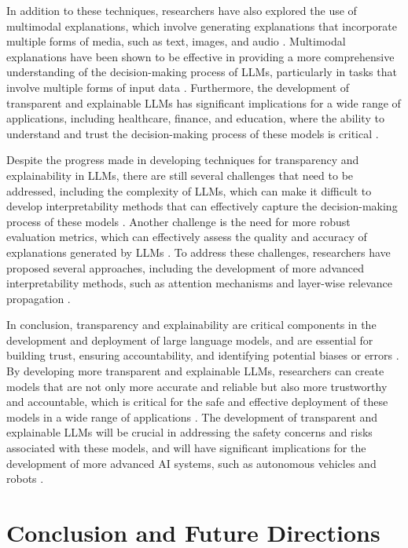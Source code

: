 \documentclass[11pt]{article}
\begin{document}
In addition to these techniques, researchers have also explored the use of multimodal explanations, which involve generating explanations that incorporate multiple forms of media, such as text, images, and audio \cite{ref269}. Multimodal explanations have been shown to be effective in providing a more comprehensive understanding of the decision-making process of LLMs, particularly in tasks that involve multiple forms of input data \cite{ref344}. Furthermore, the development of transparent and explainable LLMs has significant implications for a wide range of applications, including healthcare, finance, and education, where the ability to understand and trust the decision-making process of these models is critical \cite{ref345}.

Despite the progress made in developing techniques for transparency and explainability in LLMs, there are still several challenges that need to be addressed, including the complexity of LLMs, which can make it difficult to develop interpretability methods that can effectively capture the decision-making process of these models \cite{ref346}. Another challenge is the need for more robust evaluation metrics, which can effectively assess the quality and accuracy of explanations generated by LLMs \cite{ref347}. To address these challenges, researchers have proposed several approaches, including the development of more advanced interpretability methods, such as attention mechanisms and layer-wise relevance propagation \cite{ref348}.

In conclusion, transparency and explainability are critical components in the development and deployment of large language models, and are essential for building trust, ensuring accountability, and identifying potential biases or errors \cite{ref349}. By developing more transparent and explainable LLMs, researchers can create models that are not only more accurate and reliable but also more trustworthy and accountable, which is critical for the safe and effective deployment of these models in a wide range of applications \cite{ref350}. The development of transparent and explainable LLMs will be crucial in addressing the safety concerns and risks associated with these models, and will have significant implications for the development of more advanced AI systems, such as autonomous vehicles and robots \cite{ref342}.

\section{Conclusion and Future Directions}
\end{document}
